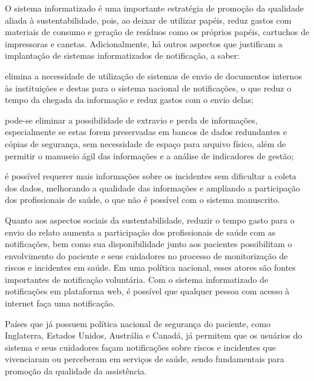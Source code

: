 \documentclass{article}
\begin{document}
O sistema informatizado é uma importante estratégia de promoção da qualidade aliada à
        sustentabilidade, pois, ao deixar de utilizar papéis, reduz gastos com materiais de consumo
        e geração de resíduos como os próprios papéis, cartuchos de impressoras e canetas.
        Adicionalmente, há outros aspectos que justificam a implantação de sistemas informatizados
        de notificação, a saber: %


elimina a necessidade de utilização de sistemas de envio de documentos internos às
            instituições e destas para o sistema nacional de notificações, o que reduz o tempo da
            chegada da informação e reduz gastos com o envio delas;

pode-se eliminar a possibilidade de extravio e perda de informações, especialmente se
            estas forem preservadas em bancos de dados redundantes e cópias de segurança, sem
            necessidade de espaço para arquivo físico, além de permitir o manuseio ágil das
            informações e a análise de indicadores de gestão;

é possível requerer mais informações sobre os incidentes sem dificultar a coleta dos
            dados, melhorando a qualidade das informações e ampliando a participação dos
            profissionais de saúde, o que não é possível com o sistema manuscrito.

Quanto aos aspectos sociais da sustentabilidade, reduzir o tempo gasto para o envio do
        relato aumenta a participação dos profissionais de saúde com as notificações, bem como sua
        disponibilidade junto aos pacientes possibilitam o envolvimento do paciente e seus
        cuidadores no processo de monitorização de riscos e incidentes em saúde. Em uma política
        nacional, esses atores são fontes importantes de notificação voluntária. Com o sistema
        informatizado de notificações em plataforma web, é possível que qualquer pessoa com acesso à
        internet faça uma notificação.

Países que já possuem política nacional de segurança do paciente, como Inglaterra, Estados
        Unidos, Austrália e Canadá, já permitem que os usuários do sistema e seus cuidadores façam
        notificações sobre riscos e incidentes que vivenciaram ou perceberam em serviços de saúde,
        sendo fundamentais para promoção da qualidade da assistência.
\end{document}
